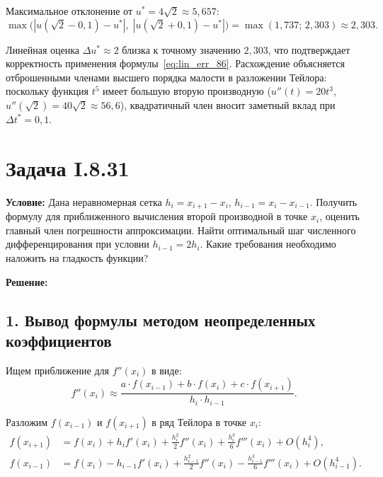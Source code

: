 \documentclass{article}
\begin{document}
Максимальное отклонение от $u^* = 4\sqrt{2} \approx 5{,}657$:
\begin{equation}
\max\bigl(|u(\sqrt{2} - 0{,}1) - u^*|,\; |u(\sqrt{2} + 0{,}1) - u^*|\bigr) 
= \max(1{,}737;\, 2{,}303) \approx 2{,}303.
\end{equation}

Линейная оценка $\Delta u^* \approx 2$ близка к точному значению $2{,}303$, 
что подтверждает корректность применения формулы~\eqref{eq:lin_err_86}. 
Расхождение объясняется отброшенными членами высшего порядка малости 
в разложении Тейлора: поскольку функция $t^5$ имеет большую вторую 
производную ($u''(t) = 20t^3$, $u''(\sqrt{2}) = 40\sqrt{2} \approx 56{,}6$), 
квадратичный член вносит заметный вклад при $\Delta t^* = 0{,}1$.





















\section*{Задача I.8.31}

\textbf{Условие:} Дана неравномерная сетка $h_i = x_{i+1} - x_i$, $h_{i-1} = x_i - x_{i-1}$. Получить формулу для приближенного вычисления второй производной в точке $x_i$, оценить главный член погрешности аппроксимации. Найти оптимальный шаг численного дифференцирования при условии $h_{i-1} = 2h_i$. Какие требования необходимо наложить на гладкость функции?

\vspace{0.5cm}
\textbf{Решение:}

\subsection*{1. Вывод формулы методом неопределенных коэффициентов}

Ищем приближение для $f''(x_i)$ в виде:
\begin{equation}
f''(x_i) \approx \frac{a \cdot f(x_{i-1}) + b \cdot f(x_i) + c \cdot f(x_{i+1})}{h_i \cdot h_{i-1}}.
\label{eq:ansatz}
\end{equation}

Разложим $f(x_{i-1})$ и $f(x_{i+1})$ в ряд Тейлора в точке $x_i$:
\begin{align}
f(x_{i+1}) &= f(x_i) + h_i f'(x_i) + \frac{h_i^2}{2} f''(x_i) + \frac{h_i^3}{6} f'''(x_i) + O(h_i^4), \\
f(x_{i-1}) &= f(x_i) - h_{i-1} f'(x_i) + \frac{h_{i-1}^2}{2} f''(x_i) - \frac{h_{i-1}^3}{6} f'''(x_i) + O(h_{i-1}^4).
\end{align}
\end{document}
